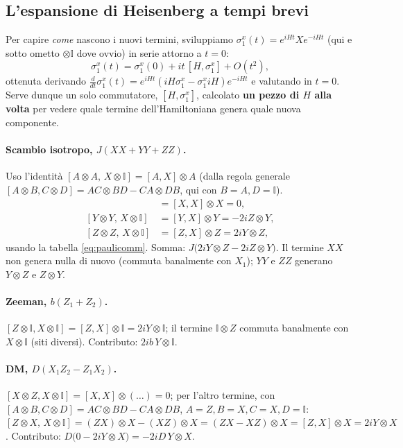 \documentclass[11pt,a4paper]{article}
\begin{document}
\subsection{L'espansione di Heisenberg a tempi brevi}

Per capire \emph{come} nascono i nuovi termini, sviluppiamo $\sigma_1^x(t)=e^{iHt}Xe^{-iHt}$
(qui e sotto ometto $\otimes\mathbb I$ dove ovvio) in serie attorno a $t=0$:
\begin{equation}
\sigma_1^x(t)=\sigma_1^x(0)+it\,[H,\sigma_1^x]+O(t^2),
\label{eq:heisexp}
\end{equation}
ottenuta derivando $\frac{d}{dt}\sigma_1^x(t)=e^{iHt}(iH\sigma_1^x-\sigma_1^x iH)e^{-iHt}$ e
valutando in $t=0$. Serve dunque un solo commutatore, $[H,\sigma_1^x]$, calcolato \textbf{un
pezzo di $H$ alla volta} per vedere quale termine dell'Hamiltoniana genera quale nuova
componente.

\paragraph{Scambio isotropo, $J(XX+YY+ZZ)$.} Uso l'identità
$[A\otimes A,\,X\otimes\mathbb I]=[A,X]\otimes A$ (dalla regola generale
$[A\otimes B,C\otimes D]=AC\otimes BD-CA\otimes DB$, qui con $B=A,D=\mathbb I$).
\begin{align}
[X\otimes X,\,X\otimes\mathbb I]&=[X,X]\otimes X=0,\\
[Y\otimes Y,\,X\otimes\mathbb I]&=[Y,X]\otimes Y=-2iZ\otimes Y,\\
[Z\otimes Z,\,X\otimes\mathbb I]&=[Z,X]\otimes Z=2iY\otimes Z,
\end{align}
usando la tabella \eqref{eq:paulicomm}. Somma: $J\big(2iY{\otimes}Z-2iZ{\otimes}Y\big)$. Il
termine $XX$ non genera nulla di nuovo (commuta banalmente con $X_1$); $YY$ e $ZZ$ generano
$Y\otimes Z$ e $Z\otimes Y$.

\paragraph{Zeeman, $b(Z_1+Z_2)$.} $[Z\otimes\mathbb I,X\otimes\mathbb I]=[Z,X]\otimes\mathbb
I=2iY\otimes\mathbb I$; il termine $\mathbb I\otimes Z$ commuta banalmente con $X\otimes\mathbb
I$ (siti diversi). Contributo: $2ib\,Y\otimes\mathbb I$.

\paragraph{DM, $D(X_1Z_2-Z_1X_2)$.} $[X\otimes Z,X\otimes\mathbb I]=[X,X]\otimes(\ldots)=0$;
per l'altro termine, con $[A\otimes B,C\otimes D]=AC\otimes BD-CA\otimes DB$, $A=Z,B=X,C=X,D=\mathbb I$:
$[Z\otimes X,\,X\otimes\mathbb I]=(ZX)\otimes X-(XZ)\otimes X=(ZX-XZ)\otimes X=[Z,X]\otimes
X=2iY\otimes X$. Contributo: $D\big(0-2iY{\otimes}X\big)=-2iD\,Y\otimes X$.
\end{document}
